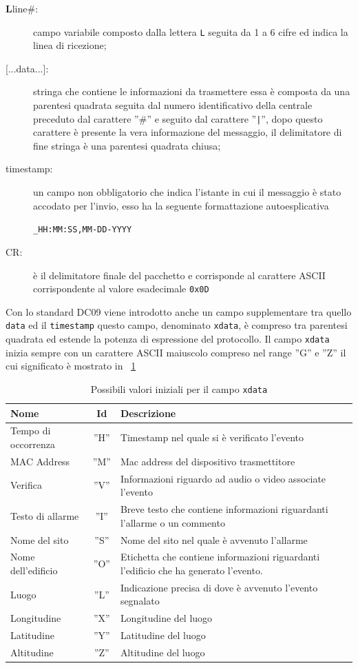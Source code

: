 \begin{description}
	\item[\textbf{L}line\#:] campo variabile composto dalla lettera \texttt{L} seguita da 1 a 6 cifre ed indica la linea di ricezione;
	\item[{[...data...]}:] stringa che contiene le informazioni da trasmettere essa è composta da una parentesi quadrata seguita dal numero identificativo della centrale preceduto dal carattere ''\#'' e seguito dal carattere ''\texttt{|}'', dopo questo carattere è presente la vera informazione del messaggio, il delimitatore di fine stringa è una parentesi quadrata chiusa;
	\item[timestamp:] un campo non obbligatorio che indica l'istante in cui il messaggio è stato accodato per l'invio, esso ha la seguente formattazione autoesplicativa
	\begin{center}
		\texttt{\_HH:MM:SS,MM-DD-YYYY}
	\end{center}
	\item[CR:] è il delimitatore finale del pacchetto e corrisponde al carattere ASCII corrispondente al valore esadecimale \texttt{0x0D}			
\end{description}
Con lo standard DC09 viene introdotto anche un campo supplementare tra quello \texttt{data} ed il \texttt{timestamp} questo campo, denominato \texttt{xdata}, è compreso tra parentesi quadrata ed estende la potenza di espressione del protocollo. Il campo \texttt{xdata} inizia sempre con un carattere ASCII maiuscolo compreso nel range ''G'' e ''Z'' il cui significato è mostrato in \tablename~\ref{tab:xdata}
\begin{table}
	\begin{tabularx}{\linewidth}{|l|c|X|}
		\hline
		\textbf{Nome} & \textbf{Id} & \textbf{Descrizione} \\
		\hline
		Tempo di occorrenza & ''H'' & Timestamp nel quale si è verificato l'evento\\
		\hline
		MAC Address & ''M'' & Mac address del dispositivo trasmettitore\\
		\hline
		Verifica & ''V'' & Informazioni riguardo ad audio o video associate l'evento\\
		\hline
		Testo di allarme & ''I'' & Breve testo che contiene informazioni riguardanti l'allarme o un commento\\
		\hline
		Nome del sito & ''S'' & Nome del sito nel quale è avvenuto l'allarme\\
		\hline
		Nome dell'edificio & ''O'' & Etichetta che contiene informazioni riguardanti l'edificio che ha generato l'evento.\\
		\hline
		Luogo & ''L'' & Indicazione precisa di dove è avvenuto l'evento segnalato\\
		\hline
		Longitudine & ''X'' & Longitudine del luogo\\
		\hline
		Latitudine & ''Y'' & Latitudine del luogo\\
		\hline
		Altitudine & ''Z'' & Altitudine del luogo\\
		\hline
	\end{tabularx}
	\caption{Possibili valori iniziali per il campo \texttt{xdata}}\label{tab:xdata}
\end{table}
